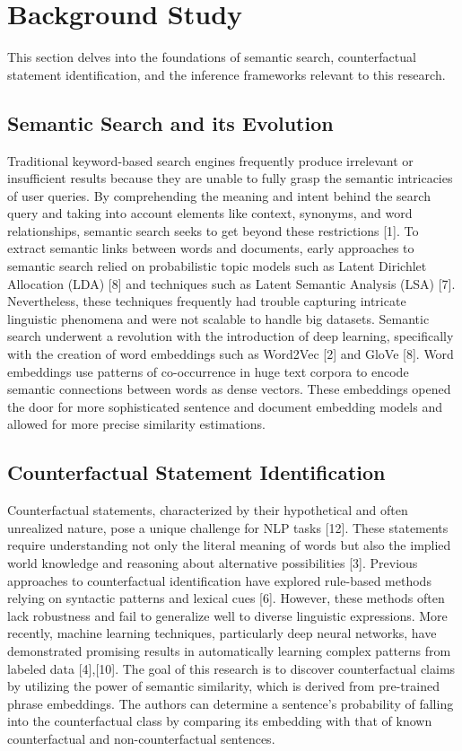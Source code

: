 \documentclass[conference]{IEEEtran}
\begin{document}
\section {Background Study}
This section delves into the foundations of semantic search, counterfactual statement identification, and the inference frameworks relevant to this research.

\subsection{Semantic Search and its Evolution}
Traditional keyword-based search engines frequently produce irrelevant or insufficient results because they are unable to fully grasp the semantic intricacies of user queries. By comprehending the meaning and intent behind the search query and taking into account elements like context, synonyms, and word relationships, semantic search seeks to get beyond these restrictions [1].
To extract semantic links between words and documents, early approaches to semantic search relied on probabilistic topic models such as Latent Dirichlet Allocation (LDA) [8] and techniques such as Latent Semantic Analysis (LSA) [7]. Nevertheless, these techniques frequently had trouble capturing intricate linguistic phenomena and were not scalable to handle big datasets.
Semantic search underwent a revolution with the introduction of deep learning, specifically with the creation of word embeddings such as Word2Vec [2] and GloVe [8]. Word embeddings use patterns of co-occurrence in huge text corpora to encode semantic connections between words as dense vectors. These embeddings opened the door for more sophisticated sentence and document embedding models and allowed for more precise similarity estimations.

\subsection{Counterfactual Statement Identification}
Counterfactual statements, characterized by their hypothetical and often unrealized nature, pose a unique challenge for NLP tasks [12]. These statements require understanding not only the literal meaning of words but also the implied world knowledge and reasoning about alternative possibilities [3].
Previous approaches to counterfactual identification have explored rule-based methods relying on syntactic patterns and lexical cues [6]. However, these methods often lack robustness and fail to generalize well to diverse linguistic expressions. More recently, machine learning techniques, particularly deep neural networks, have demonstrated promising results in automatically learning complex patterns from labeled data [4],[10].
The goal of this research is to discover counterfactual claims by utilizing the power of semantic similarity, which is derived from pre-trained phrase embeddings. The authors can determine a sentence's probability of falling into the counterfactual class by comparing its embedding with that of known counterfactual and non-counterfactual sentences.
\end{document}
